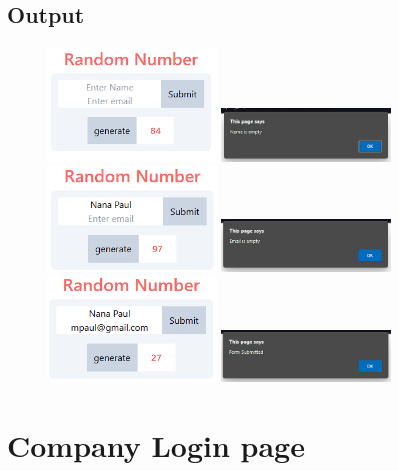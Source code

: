 \documentclass{article}
\begin{document}
\subsection{Output}
\begin{figure}[h!]
	\centering
	\includegraphics[width=0.4\textwidth]{./Assets/p1501.png}
	\includegraphics[width=0.4\textwidth]{./Assets/p1502.png}
	\includegraphics[width=0.4\textwidth]{./Assets/p1503.png}
	\includegraphics[width=0.4\textwidth]{./Assets/p1504.png}
	\includegraphics[width=0.4\textwidth]{./Assets/p1505.png}
	\includegraphics[width=0.4\textwidth]{./Assets/p1506.png}
\end{figure}
\newpage

\section{Company Login page}
\end{document}
